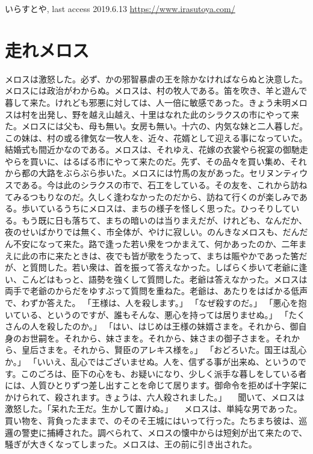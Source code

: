 \documentclass[uplatex, twocolumn,10pt]{jsarticle}
\begin{document}
\begin{thebibliography}{99}
     いらすとや, last access 2019.6.13 \url{https://www.irasutoya.com/}

\section{走れメロス}
メロスは激怒した。必ず、かの邪智暴虐の王を除かなければならぬと決意した。メロスには政治がわからぬ。メロスは、村の牧人である。笛を吹き、羊と遊んで暮して来た。けれども邪悪に対しては、人一倍に敏感であった。きょう未明メロスは村を出発し、野を越え山越え、十里はなれた此のシラクスの市にやって来た。メロスには父も、母も無い。女房も無い。十六の、内気な妹と二人暮しだ。この妹は、村の或る律気な一牧人を、近々、花婿として迎える事になっていた。結婚式も間近かなのである。メロスは、それゆえ、花嫁の衣裳やら祝宴の御馳走やらを買いに、はるばる市にやって来たのだ。先ず、その品々を買い集め、それから都の大路をぶらぶら歩いた。メロスには竹馬の友があった。セリヌンティウスである。今は此のシラクスの市で、石工をしている。その友を、これから訪ねてみるつもりなのだ。久しく逢わなかったのだから、訪ねて行くのが楽しみである。歩いているうちにメロスは、まちの様子を怪しく思った。ひっそりしている。もう既に日も落ちて、まちの暗いのは当りまえだが、けれども、なんだか、夜のせいばかりでは無く、市全体が、やけに寂しい。のんきなメロスも、だんだん不安になって来た。路で逢った若い衆をつかまえて、何かあったのか、二年まえに此の市に来たときは、夜でも皆が歌をうたって、まちは賑やかであった筈だが、と質問した。若い衆は、首を振って答えなかった。しばらく歩いて老爺に逢い、こんどはもっと、語勢を強くして質問した。老爺は答えなかった。メロスは両手で老爺のからだをゆすぶって質問を重ねた。老爺は、あたりをはばかる低声で、わずか答えた。
「王様は、人を殺します。」
「なぜ殺すのだ。」
「悪心を抱いている、というのですが、誰もそんな、悪心を持っては居りませぬ。」
「たくさんの人を殺したのか。」
「はい、はじめは王様の妹婿さまを。それから、御自身のお世嗣を。それから、妹さまを。それから、妹さまの御子さまを。それから、皇后さまを。それから、賢臣のアレキス様を。」
「おどろいた。国王は乱心か。」
「いいえ、乱心ではございませぬ。人を、信ずる事が出来ぬ、というのです。このごろは、臣下の心をも、お疑いになり、少しく派手な暮しをしている者には、人質ひとりずつ差し出すことを命じて居ります。御命令を拒めば十字架にかけられて、殺されます。きょうは、六人殺されました。」
　聞いて、メロスは激怒した。「呆れた王だ。生かして置けぬ。」
　メロスは、単純な男であった。買い物を、背負ったままで、のそのそ王城にはいって行った。たちまち彼は、巡邏の警吏に捕縛された。調べられて、メロスの懐中からは短剣が出て来たので、騒ぎが大きくなってしまった。メロスは、王の前に引き出された。

\end{thebibliography}
\end{document}

